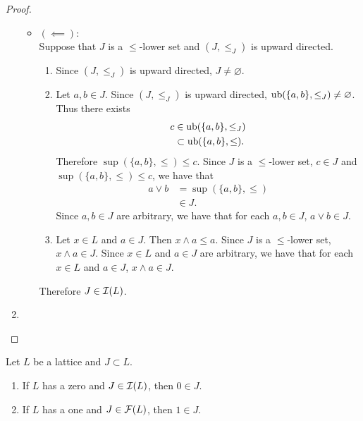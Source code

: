 \documentclass{book}
\begin{document}
\begin{proof}
\begin{enumerate}
\begin{itemize}
\begin{itemize}
				\end{itemize}
				\item $(\impliedby)$: \\
				Suppose that $J$ is a $\leq$-lower set and $(J, \leq_J)$ is upward directed. 
				\begin{enumerate}
					\item Since $(J, \leq_J)$ is upward directed, $J \neq \varnothing$.
					\item Let $a,b \in J$. Since $(J, \leq_J)$ is upward directed, $\operatorname{ub}(\{a,b\}, \leq_J) \neq \varnothing$. Thus there exists  
					\begin{align}
						c 
						& \in \operatorname{ub}(\{a,b\}, \leq_J) \\
						& \subset \operatorname{ub}(\{a,b\}, \leq).
					\end{align}
					Therefore $\sup(\{a,b\}, \leq) \leq c$. Since $J$ is a $\leq$-lower set, $c \in J$ and $\sup(\{a,b\}, \leq) \leq c$, we have that 
					\begin{align*}
						a \vee b
						& = \sup(\{a,b\}, \leq) \\
						& \in J.
					\end{align*}
					Since $a,b \in J$ are arbitrary, we have that for each $a,b \in J$, $a \vee b \in J$.
					\item Let $x \in L$ and $a \in J$. Then $x \wedge a \leq a$. Since $J$ is a $\leq$-lower set, $x \wedge a \in J$. Since $x \in L$ and $a \in J$ are arbitrary, we have that for each $x \in L$ and $a \in J$, $x \wedge a \in J$.
				\end{enumerate}
				Therefore $J \in \mathcal{I}(L)$.
			\end{itemize}
			\item 
		\end{enumerate}
	\end{proof}
	
	\begin{ex}
		Let $L$ be a lattice and $J \subset L$.
		\begin{enumerate}
			\item If $L$ has a zero and $J \in \mathcal{I}(L)$, then $0 \in J$.
			\item If $L$ has a one and $J \in \mathcal{F}(L)$, then $1 \in J$.
		\end{enumerate} 
	\end{ex}
	
\end{document}
